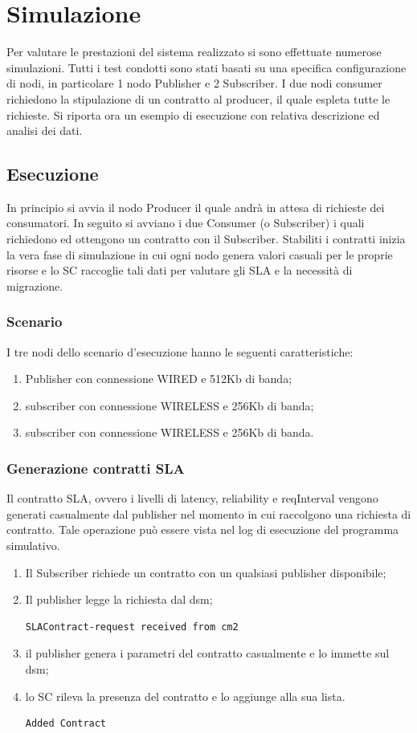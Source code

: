 \chapter{Simulazione}
Per valutare le prestazioni del sistema realizzato si sono effettuate numerose simulazioni. Tutti i test condotti sono stati basati su una specifica configurazione di nodi, in particolare 1 nodo Publisher e 2 Subscriber. I due nodi consumer richiedono la stipulazione di un contratto al producer, il quale espleta tutte le richieste. Si riporta ora un esempio di esecuzione con relativa descrizione ed analisi dei dati.
\section{Esecuzione}
In principio si avvia il nodo Producer il quale andrà in attesa di richieste dei consumatori. In seguito si avviano i due Consumer (o Subscriber) i quali richiedono ed ottengono un contratto con il Subscriber. Stabiliti i contratti inizia la vera fase di simulazione in cui ogni nodo genera valori casuali per le proprie risorse e lo SC raccoglie tali dati per valutare gli SLA e la necessità di migrazione.
\subsection{Scenario}
I tre nodi dello scenario d'esecuzione hanno le seguenti caratteristiche:
\begin{enumerate}
	\item Publisher con connessione WIRED e 512Kb di banda;
	\item subscriber con connessione WIRELESS e 256Kb di banda;
	\item subscriber con connessione WIRELESS e 256Kb di banda.
\end{enumerate}
\subsection{Generazione contratti SLA}
Il contratto SLA, ovvero i livelli di latency, reliability e reqInterval vengono generati casualmente dal publisher nel momento in cui raccolgono una richiesta di contratto. Tale operazione può essere vista nel log di esecuzione del programma simulativo.
\begin{enumerate}
\item Il Subscriber richiede un contratto con un qualsiasi publisher disponibile;
\item Il publisher legge la richiesta dal dsm;
\begin{center}
\begin{verbatim}
SLAContract-request received from cm2
\end{verbatim}
\end{center}
\item il publisher genera i parametri del contratto casualmente e lo immette sul dsm;
\item lo SC rileva la presenza del contratto e lo aggiunge alla sua lista.
\begin{center}
\begin{verbatim}
Added Contract
\end{verbatim}
\end{center}
\end{enumerate}
